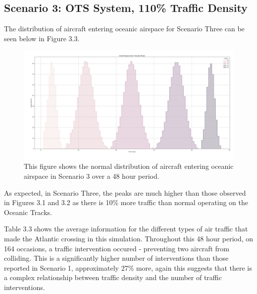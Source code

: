 \documentclass[stu, a4paper, 12pt, floatsintext]{apa7}
\numberwithin{figure}{section}
\numberwithin{table}{section}
\numberwithin{equation}{section}
\begin{document}
\subsection{Scenario 3: OTS System, 110\% Traffic Density}
The distribution of aircraft entering oceanic airspace for Scenario Three can be seen below in Figure 3.3.

\begin{figure}[H]
    \caption{This figure shows the normal distribution of aircraft entering oceanic airspace in Scenario 3 over a 48 hour period.}
    \label{fig:3.3}
    \centering
    \includegraphics[width=1.1\textwidth]{pictures/Figure 3.3.png}    
\end{figure}

As expected, in Scenario Three, the peaks are much higher than those observed in Figures 3.1 and 3.2 as there is 10\% more traffic than normal operating on the Oceanic Tracks.

Table 3.3 shows the average information for the different types of air traffic that made the Atlantic crossing in this simulation. Throughout this 48 hour period, on 164 occasions, a traffic intervention occured - preventing two aircraft from colliding. This is a significantly higher number of interventions than those reported in Scenario 1, approximately 27\% more, again this suggests that there is a complex relationship between traffic density and the number of traffic interventions.
\end{document}
